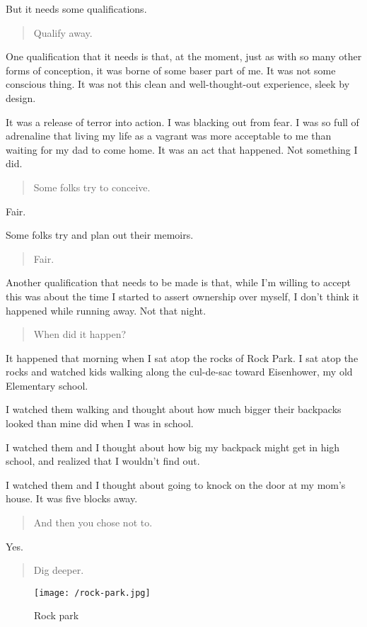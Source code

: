 But it needs some qualifications.

\begin{quote}
Qualify away.
\end{quote}

One qualification that it needs is that, at the moment, just as with so many other forms of conception, it was borne of some baser part of me. It was not some conscious thing. It was not this clean and well-thought-out experience, sleek by design.

It was a release of terror into action. I was blacking out from fear. I was so full of adrenaline that living my life as a vagrant was more acceptable to me than waiting for my dad to come home. It was an act that happened. Not something I did.

\begin{quote}
Some folks try to conceive.
\end{quote}

Fair.

Some folks try and plan out their memoirs.

\begin{quote}
Fair.
\end{quote}

Another qualification that needs to be made is that, while I'm willing to accept this was about the time I started to assert ownership over myself, I don't think it happened while running away. Not that night.

\begin{quote}
When did it happen?
\end{quote}

It happened that morning when I sat atop the rocks of Rock Park. I sat atop the rocks and watched kids walking along the cul-de-sac toward Eisenhower, my old Elementary school.

I watched them walking and thought about how much bigger their backpacks looked than mine did when I was in school.

I watched them and I thought about how big my backpack might get in high school, and realized that I wouldn't find out.

I watched them and I thought about going to knock on the door at my mom's house. It was five blocks away.

\begin{quote}
And then you chose not to.
\end{quote}

Yes.

\begin{quote}
Dig deeper.
\end{quote}

\begin{figure}
\centering
\texttt{[image: /rock-park.jpg]}
\caption{Rock park}
\end{figure}
